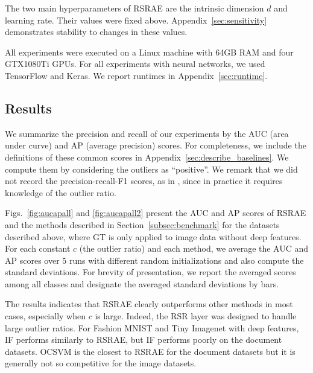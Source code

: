 \documentclass{article} \usepackage{iclr2020_conference,times}
\def\Secref#1{Section~\ref{#1}}
\begin{document}
{The two main hyperparameters of RSRAE are the intrinsic dimension $d$ and learning rate. Their values were fixed above. Appendix~\ref{sec:sensitivity} demonstrates stability to changes in these values.}

All experiments were executed on a Linux machine with 64GB RAM and four GTX1080Ti GPUs.
For all experiments with neural networks, we used TensorFlow and Keras. We report runtimes in  Appendix~\ref{sec:runtime}.






\subsection{Results}\label{subsec:res}

We summarize the precision and recall of our experiments by the AUC (area under curve) and AP (average precision) scores. For completeness, we include the definitions of these common scores in Appendix~\ref{sec:describe_baselines}.  We
compute them by considering the outliers as ``positive''.
We remark that we did not record the precision-recall-F1 scores, as in \citet{xia2015learning,zong2018deep}, since in practice it requires knowledge of the outlier ratio.

Figs.~\ref{fig:aucapall} and \ref{fig:aucapall2} present the AUC and AP scores of RSRAE and the methods described in \Secref{subsec:benchmark} for the datasets described above, where GT is only applied to image data without deep features. For each constant $c$ (the outlier ratio) and each method, we average the AUC and AP scores over 5 runs with different random initializations and also compute the standard deviations. For brevity of presentation, we report the averaged scores among all classes and designate the averaged standard deviations by bars. 

The results indicates that RSRAE clearly outperforms other methods in most cases, especially when $c$ is large. Indeed, the RSR layer was designed to handle large outlier ratios. For Fashion MNIST and Tiny Imagenet with deep features, IF performs similarly to RSRAE, but IF performs poorly on the document datasets. OCSVM is the closest to RSRAE for the document datasets but it is generally not so competitive for the image datasets. 
\end{document}
